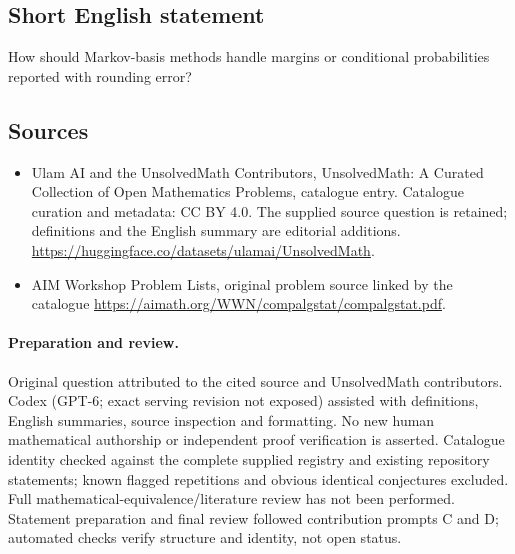 \documentclass[11pt]{article}
\begin{document}
\subsection{Short English statement}
How should Markov-basis methods handle margins or conditional probabilities reported with rounding error?
\subsection{Sources}
\begin{itemize}
\item[\hypertarget{source:statement:1}{S1}] Ulam AI and the UnsolvedMath Contributors, UnsolvedMath: A Curated Collection of Open Mathematics Problems, catalogue entry. Catalogue curation and metadata: CC BY 4.0. The supplied source question is retained; definitions and the English summary are editorial additions.
\url{https://huggingface.co/datasets/ulamai/UnsolvedMath}.
\item[\hypertarget{source:statement:2}{S2}] AIM Workshop Problem Lists, original problem source linked by the catalogue
\url{https://aimath.org/WWN/compalgstat/compalgstat.pdf}.
\end{itemize}
\paragraph{Preparation and review.}
Original question attributed to the cited source and UnsolvedMath contributors. Codex (GPT-6; exact serving revision not exposed) assisted with definitions, English summaries, source inspection and formatting. No new human mathematical authorship or independent proof verification is asserted. Catalogue identity checked against the complete supplied registry and existing repository statements; known flagged repetitions and obvious identical conjectures excluded. Full mathematical-equivalence/literature review has not been performed. Statement preparation and final review followed contribution prompts C and D; automated checks verify structure and identity, not open status.
\label{end:statement}
\end{document}
